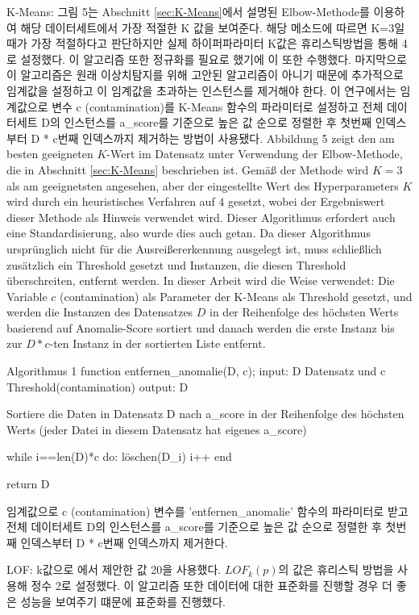         K-Means: 그림 5는 Abschnitt \ref{sec:K-Means}에서 설명된 Elbow-Methode를 이용하여 해당 데이터세트에서 가장 적절한 K 값을 보여준다. 해당 메소드에 따르면 K=3일때가 가장 적절하다고 판단하지만 실제 하이퍼파라미터 K값은 휴리스틱방법을 통해 4로 설정했다. 이 알고리즘 또한 정규화를 필요로 했기에 이 또한 수행했다. 마지막으로 이 알고리즘은 원래 이상치탐지를 위해 고안된 알고리즘이 아니기 때문에 추가적으로 임계값을 설정하고 이 임계값을 초과하는 인스턴스를 제거해야 한다. 이 연구에서는 임계값으로 변수 c (contamination)를 K-Means 함수의 파라미터로 설정하고 전체 데이터세트 D의 인스턴스를 a_score를 기준으로 높은 값 순으로 정렬한 후 첫번째 인덱스부터 D * c번째 인덱스까지 제거하는 방법이 사용됐다.
        Abbildung 5 zeigt den am besten geeigneten $K$-Wert im Datensatz unter Verwendung der Elbow-Methode, die in Abschnitt \ref{sec:K-Means} beschrieben ist. Gemäß der Methode wird $K = 3$ als am geeignetsten angesehen, aber der eingestellte Wert des Hyperparameters $K$ wird durch ein heuristisches Verfahren auf $4$ gesetzt, wobei der Ergebniswert dieser Methode als Hinweis verwendet wird. Dieser Algorithmus erfordert auch eine Standardisierung, also wurde dies auch getan. Da dieser Algorithmus ursprünglich nicht für die Ausreißererkennung ausgelegt ist, muss schließlich zusätzlich ein Threshold gesetzt und Instanzen, die diesen Threshold überschreiten, entfernt werden. In dieser Arbeit wird die Weise verwendet: Die Variable $c$ (contamination) als Parameter der K-Means als Threshold gesetzt, und werden die Instanzen des Datensatzes $D$ in der Reihenfolge des höchsten Werts basierend auf Anomalie-Score sortiert und danach werden die erste Instanz bis zur $D * c$-ten Instanz in der sortierten Liste entfernt.

        Algorithmus 1
        function entfernen_anomalie(D, c);
        input: D Datensatz und c Threshold(contamination)
        output: D

        Sortiere die Daten in Datensatz D nach a_score in der Reihenfolge des höchsten Werts
        (jeder Datei in diesem Datensatz hat eigenes a_score)

        while i==len(D)*c do:
            löschen(D_i)
            i++
        end

        return D

        임계값으로 c (contamination) 변수를 'entfernen_anomalie' 함수의 파라미터로 받고 전체 데이터세트 D의 인스턴스를 a_score를 기준으로 높은 값 순으로 정렬한 후 첫번째 인덱스부터 D * c번째 인덱스까지 제거한다.

        LOF: k값으로 \cite{Breunig00}에서 제안한 값 20을 사용했다. $LOF_k(p)$의 값은 휴리스틱 방법을 사용해 정수 2로 설정했다. 이 알고리즘 또한 데이터에 대한 표준화를 진행할 경우 더 좋은 성능을 보여주기 떄문에 표준화를 진행했다.

